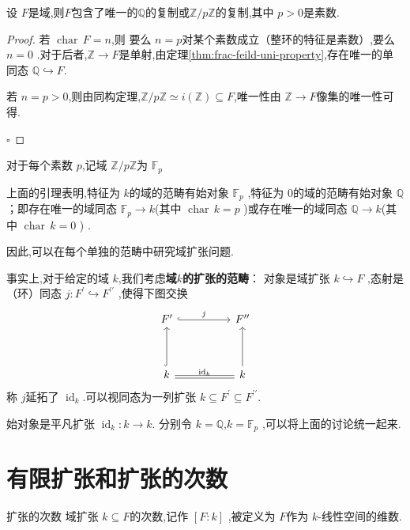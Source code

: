 \documentclass[lang=cn,12pt,color=green,fontset=none,pad]{elegantbook}
\begin{document}
\begin{lemma}
    设 \(  F  \)是域,则\(  F  \)包含了唯一的\(  \mathbb{Q}   \)的复制或\(  \mathbb{Z} /p\mathbb{Z}   \)的复制,其中 \(  p>0  \)是素数. 
\end{lemma}
\begin{proof}
    若 \(  \operatorname{char}\,F=n  \),则 要么 \(  n =p  \)对某个素数成立（整环的特征是素数）,要么 \(  n =0  \)  .对于后者,\(  \mathbb{Z} \to F  \)是单射,由定理\ref{thm:frac-feild-uni-property},存在唯一的单同态 \(  \mathbb{Q} \hookrightarrow F  \).
    
    若 \(  n = p>0  \),则由同构定理,\(  \mathbb{Z} /p\mathbb{Z} \simeq i\left( \mathbb{Z}  \right)\subseteq F   \),唯一性由 \(\mathbb{Z} \to F   \)像集的唯一性可得.   

    \hfill $\square$
\end{proof}

\begin{definition}
    对于每个素数 \(  p  \),记域 \(  \mathbb{Z} /p\mathbb{Z}   \)为 \(  \mathbb{F}_{p}  \)   
\end{definition}

上面的引理表明,特征为 \(  k  \)的域的范畴有始对象  \(  \mathbb{F}_{p}  \)  ,特征为 \(  0  \)的域的范畴有始对象 \(  \mathbb{Q}   \)；即存在唯一的域同态 \(  \mathbb{F}_{p}\to k  \)(其中 \(  \operatorname{char}\,k=p  \) )或存在唯一的域同态 \(  \mathbb{Q}\to k  \)(其中 \(  \operatorname{char}\,k=0  \) )    .

因此,可以在每个单独的范畴中研究域扩张问题.

事实上,对于给定的域 \(  k  \),我们考虑\textbf{域\(  k  \)的扩张的范畴}： 对象是域扩张 \(  k\hookrightarrow F  \)  ,态射是（环）同态 \(  j:F^{\prime} \hookrightarrow F^{\prime \prime}   \) ,使得下图交换
\[\begin{tikzcd}
	{F^{\prime}} && {F^{\prime\prime}} \\
	\\
	k && k
	\arrow["j", hook, from=1-1, to=1-3]
	\arrow[hook, from=3-1, to=1-1]
	\arrow[no head, from=3-1, to=3-3]
	\arrow["{\mathrm{id}_k}", shift right, no head, from=3-1, to=3-3]
	\arrow[from=3-3, to=1-3]
\end{tikzcd}\]
称 \(  j  \)延拓了 \(  \operatorname{id}_{k}  \).可以视同态为一列扩张 \(  k\subseteq F^{\prime} \subseteq F^{\prime \prime}   \).

始对象是平凡扩张 \(  \operatorname{id}_{k}:k\to k  \). 分别令 \(  k=\mathbb{Q}  \),\(  k= \mathbb{F}_{p}  \) ,可以将上面的讨论统一起来.

\section{有限扩张和扩张的次数}
\begin{definition}{扩张的次数}
    域扩张 \(  k\subseteq F  \)的次数,记作 \(  \left[ F:k \right]   \)  ,被定义为 \(  F  \)作为 \(  k  \)-线性空间的维数.  
\end{definition}
\end{document}

